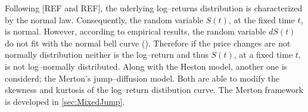 \documentclass[12pt]{report}
\newcommand{\St}{S\left(t\right)}
\begin{document}
Following [REF and REF], the uderlying log--returns distribution is characterized by the normal law. Consequently, the random variable $\St$, at the fixed time $t$, is normal. 
However, according to empirical results, the random variable $d\St$ do not fit with the normal bell curve (\citet{clark1973}).
Therefore if the price changes are not normally distribution neither is the log--return and thus $\St$, at a fixed time $t$, is not log--normally distributed.
Along with the Heston model, another one is considerd; the Merton's jump--diffusion model. Both are able to modify the skewness and kurtosis of the log--return distibution curve. The Merton framework is developed in \cref{sec:MixedJump}. 























\end{document}

